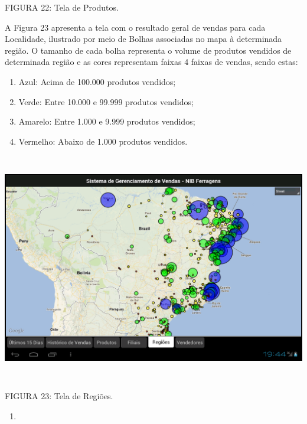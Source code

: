 \documentclass[a4paper]{article}
\newcommand\liststyleWWviiiNumi{%
\renewcommand\theenumi{\arabic{enumi}}
\renewcommand\theenumii{\arabic{enumi}.\arabic{enumii}}
\renewcommand\theenumiii{\arabic{enumi}.\arabic{enumii}.\arabic{enumiii}}
\renewcommand\theenumiv{\arabic{enumi}.\arabic{enumii}.\arabic{enumiii}.\arabic{enumiv}}
\renewcommand\labelenumi{\theenumi}
\renewcommand\labelenumii{\theenumii}
\renewcommand\labelenumiii{\theenumiii}
\renewcommand\labelenumiv{\theenumiv.}
}
\newcommand\liststyleWWviiiNumxxxv{%
\renewcommand\theenumi{\alph{enumi}}
\renewcommand\theenumii{\alph{enumii}}
\renewcommand\theenumiii{\roman{enumiii}}
\renewcommand\theenumiv{\arabic{enumiv}}
\renewcommand\labelenumi{\theenumi)}
\renewcommand\labelenumii{\theenumii.}
\renewcommand\labelenumiii{\theenumiii.}
\renewcommand\labelenumiv{\theenumiv.}
}
\begin{document}
{
\textsf{\MakeUppercase{FIGURA 22}}\textsf{: Tela de Produtos. }}

{
\textsf{A Figura 23 apresenta a tela com o resultado geral de vendas para cada Localidade, ilustrado por meio de Bolhas
associadas no mapa \`a determinada regi\~ao. O tamanho de cada bolha representa o volume de produtos vendidos de
determinada regi\~ao e as cores representam faixas 4 faixas de vendas, sendo estas:}}

\liststyleWWviiiNumxxxv
\begin{enumerate}
\item {\sffamily
Azul: Acima de 100.000 produtos vendidos;}
\item {\sffamily
Verde: Entre 10.000 e 99.999 produtos vendidos;}
\item {\sffamily
Amarelo: Entre 1.000 e 9.999 produtos vendidos;}
\item {\sffamily
Vermelho: Abaixo de 1.000 produtos vendidos. }
\end{enumerate}
 \includegraphics[width=15.976cm,height=10.031cm]{monograph-img023.png} 

{
\textsf{\MakeUppercase{FIGURA 23}}\textsf{: Tela de Regi\~oes. }}


\bigskip

\liststyleWWviiiNumi
\begin{enumerate}
\item {}
\end{enumerate}
\end{document}
